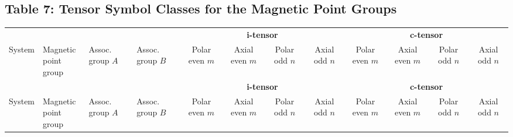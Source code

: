 \documentclass[a4paper,11pt]{article}
\begin{document}
\newpage
\begin{landscape}
\section*{Table 7: Tensor Symbol Classes for the Magnetic Point Groups}
\label{sec:table7}
\footnotesize
\setlength{\tabcolsep}{6pt}
\renewcommand{\arraystretch}{1.10}
\begin{longtable}{l l l l *{4}{c} *{4}{c}}
\toprule
& & & & \multicolumn{4}{c}{\textbf{i-tensor}} & \multicolumn{4}{c}{\textbf{c-tensor}} \\
\cmidrule(lr){5-8} \cmidrule(lr){9-12}
System & \shortstack{Magnetic\\point group} & \shortstack{Assoc.\\group $A$} & \shortstack{Assoc.\\group $B$} &
  \shortstack{Polar\\even $m$} & \shortstack{Axial\\even $m$} & \shortstack{Polar\\odd $n$} & \shortstack{Axial\\odd $n$} &
  \shortstack{Polar\\even $m$} & \shortstack{Axial\\even $m$} & \shortstack{Polar\\odd $n$} & \shortstack{Axial\\odd $n$} \\
\midrule
\endfirsthead
\toprule
& & & & \multicolumn{4}{c}{\textbf{i-tensor}} & \multicolumn{4}{c}{\textbf{c-tensor}} \\
\cmidrule(lr){5-8} \cmidrule(lr){9-12}
System & \shortstack{Magnetic\\point group} & \shortstack{Assoc.\\group $A$} & \shortstack{Assoc.\\group $B$} &
  \shortstack{Polar\\even $m$} & \shortstack{Axial\\even $m$} & \shortstack{Polar\\odd $n$} & \shortstack{Axial\\odd $n$} &
  \shortstack{Polar\\even $m$} & \shortstack{Axial\\even $m$} & \shortstack{Polar\\odd $n$} & \shortstack{Axial\\odd $n$} \\

\end{longtable}
\end{landscape}
\end{document}
